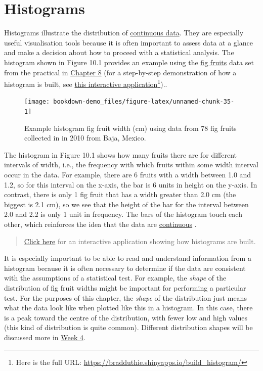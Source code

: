 \documentclass[
]{scrbook}
\begin{document}
\hypertarget{histograms}{%
\section{Histograms}\label{histograms}}

Histograms illustrate the distribution of \protect\hyperlink{Chapter_5}{continuous data}.
They are especially useful visualisation tools because it is often important to assess data at a glance and make a decision about how to proceed with a statistical analysis.
The histogram shown in Figure 10.1 provides an example using the \href{https://raw.githubusercontent.com/bradduthie/statistical_techniques/main/data/fig_fruits.csv}{fig fruits} data set from the practical in \protect\hyperlink{Chapter_8}{Chapter 8} (for a step-by-step demonstration of how a histogram is built, see \href{https://bradduthie.shinyapps.io/build_histogram/}{this interactive application}\footnote{Here is the full URL: \url{https://bradduthie.shinyapps.io/build_histogram/}})..

\begin{figure}
\texttt{[image: bookdown-demo\_files/figure-latex/unnamed-chunk-35-1]} \caption{Example histogram fig fruit width (cm) using data from 78 fig fruits collected in in 2010 from Baja, Mexico.}\label{fig:unnamed-chunk-35}
\end{figure}

The histogram in Figure 10.1 shows how many fruits there are for different intervals of width, i.e., the frequency with which fruits within some width interval occur in the data.
For example, there are 6 fruits with a width between 1.0 and 1.2, so for this interval on the x-axis, the bar is 6 units in height on the y-axis.
In contrast, there is only 1 fig fruit that has a width greater than 2.0 cm (the biggest is 2.1 cm), so we see that the height of the bar for the interval between 2.0 and 2.2 is only 1 unit in frequency.
The bars of the histogram touch each other, which reinforces the idea that the data are \protect\hyperlink{Chapter_5}{continuous} \citep{Dytham2011, Sokal1995}.

\begin{quote}
\href{https://bradduthie.shinyapps.io/build_histogram/}{Click here} for an interactive application showing how histograms are built.
\end{quote}

It is especially important to be able to read and understand information from a histogram because it is often necessary to determine if the data are consistent with the assumptions of a statistical test.
For example, the \emph{shape} of the distribution of fig fruit widths might be important for performing a particular test.
For the purposes of this chapter, the \emph{shape} of the distribution just means what the data look like when plotted like this in a histogram.
In this case, there is a peak toward the centre of the distribution, with fewer low and high values (this kind of distribution is quite common).
Different distribution shapes will be discussed more in \protect\hyperlink{Week4}{Week 4}.
\end{document}
